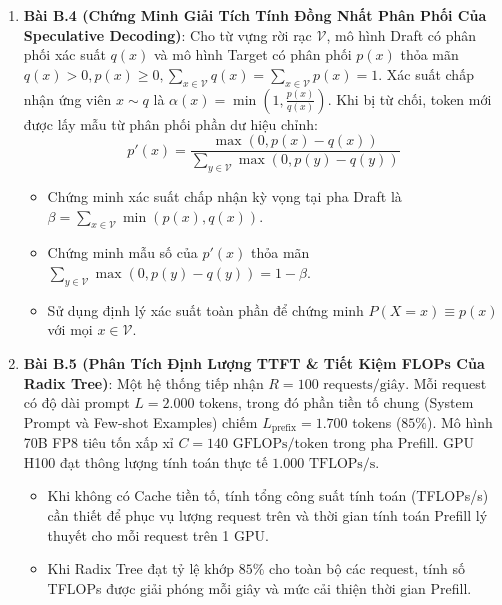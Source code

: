 \begin{enumerate}
  \item \textbf{Bài B.4 (Chứng Minh Giải Tích Tính Đồng Nhất Phân Phối Của Speculative Decoding)}:
  Cho từ vựng rời rạc $\mathcal{V}$, mô hình Draft có phân phối xác suất $q(x)$ và mô hình Target có phân phối $p(x)$ thỏa mãn $q(x) > 0, p(x) \ge 0, \sum_{x \in \mathcal{V}} q(x) = \sum_{x \in \mathcal{V}} p(x) = 1$.
  Xác suất chấp nhận ứng viên $x \sim q$ là $\alpha(x) = \min\left(1, \frac{p(x)}{q(x)}\right)$. Khi bị từ chối, token mới được lấy mẫu từ phân phối phần dư hiệu chỉnh:
  \begin{equation*}
  p'(x) = \frac{\max(0, p(x) - q(x))}{\sum_{y \in \mathcal{V}} \max(0, p(y) - q(y))}
  \end{equation*}
  \begin{itemize}
    \item[a)] Chứng minh xác suất chấp nhận kỳ vọng tại pha Draft là $\beta = \sum_{x \in \mathcal{V}} \min(p(x), q(x))$.
    \item[b)] Chứng minh mẫu số của $p'(x)$ thỏa mãn $\sum_{y \in \mathcal{V}} \max(0, p(y) - q(y)) = 1 - \beta$.
    \item[c)] Sử dụng định lý xác suất toàn phần để chứng minh $P(X = x) \equiv p(x)$ với mọi $x \in \mathcal{V}$.
  \end{itemize}

  \item \textbf{Bài B.5 (Phân Tích Định Lượng TTFT \& Tiết Kiệm FLOPs Của Radix Tree)}:
  Một hệ thống tiếp nhận $R = 100\text{ requests/giây}$. Mỗi request có độ dài prompt $L = 2.000$ tokens, trong đó phần tiền tố chung (System Prompt và Few-shot Examples) chiếm $L_{\text{prefix}} = 1.700$ tokens ($85\%$).
  Mô hình 70B FP8 tiêu tốn xấp xỉ $C = 140\text{ GFLOPs/token}$ trong pha Prefill. GPU H100 đạt thông lượng tính toán thực tế $1.000\text{ TFLOPs/s}$.
  \begin{itemize}
    \item[a)] Khi không có Cache tiền tố, tính tổng công suất tính toán (TFLOPs/s) cần thiết để phục vụ lượng request trên và thời gian tính toán Prefill lý thuyết cho mỗi request trên 1 GPU.
    \item[b)] Khi Radix Tree đạt tỷ lệ khớp $85\%$ cho toàn bộ các request, tính số TFLOPs được giải phóng mỗi giây và mức cải thiện thời gian Prefill.
  \end{itemize}
\end{enumerate}

